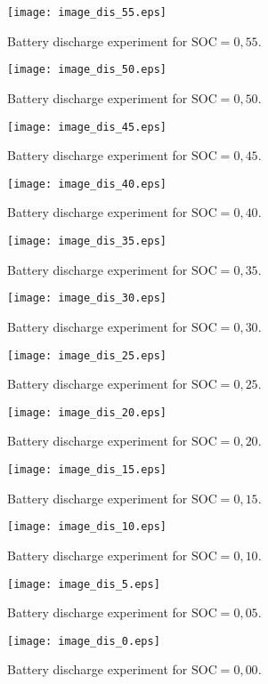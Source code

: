 \begin{figure}[h!]
	\centering
  	\texttt{[image: image\_dis\_55.eps]}
  	\caption{Battery discharge experiment for $\mathrm{SOC} = 0,55$.}
	\label{fig:image_dis_55}
\end{figure}
\begin{figure}[h!]
	\centering
  	\texttt{[image: image\_dis\_50.eps]}
  	\caption{Battery discharge experiment for $\mathrm{SOC} = 0,50$.}
	\label{fig:image_dis_50}
\end{figure}
\begin{figure}[h!]
	\centering
  	\texttt{[image: image\_dis\_45.eps]}
  	\caption{Battery discharge experiment for $\mathrm{SOC} = 0,45$.}
	\label{fig:image_dis_45}
\end{figure}
\begin{figure}[h!]
	\centering
  	\texttt{[image: image\_dis\_40.eps]}
  	\caption{Battery discharge experiment for $\mathrm{SOC} = 0,40$.}
	\label{fig:image_dis_40}
\end{figure}
\begin{figure}[h!]
	\centering
  	\texttt{[image: image\_dis\_35.eps]}
  	\caption{Battery discharge experiment for $\mathrm{SOC} = 0,35$.}
	\label{fig:image_dis_35}
\end{figure}
\begin{figure}[h!]
	\centering
  	\texttt{[image: image\_dis\_30.eps]}
  	\caption{Battery discharge experiment for $\mathrm{SOC} = 0,30$.}
	\label{fig:image_dis_30}
\end{figure}
\begin{figure}[h!]
	\centering
  	\texttt{[image: image\_dis\_25.eps]}
  	\caption{Battery discharge experiment for $\mathrm{SOC} = 0,25$.}
	\label{fig:image_dis_25}
\end{figure}
\begin{figure}[h!]
	\centering
  	\texttt{[image: image\_dis\_20.eps]}
  	\caption{Battery discharge experiment for $\mathrm{SOC} = 0,20$.}
	\label{fig:image_dis_20}
\end{figure}
\begin{figure}[h!]
	\centering
  	\texttt{[image: image\_dis\_15.eps]}
  	\caption{Battery discharge experiment for $\mathrm{SOC} = 0,15$.}
	\label{fig:image_dis_15}
\end{figure}
\begin{figure}[h!]
	\centering
  	\texttt{[image: image\_dis\_10.eps]}
  	\caption{Battery discharge experiment for $\mathrm{SOC} = 0,10$.}
	\label{fig:image_dis_10}
\end{figure}
\begin{figure}[h!]
	\centering
  	\texttt{[image: image\_dis\_5.eps]}
  	\caption{Battery discharge experiment for $\mathrm{SOC} = 0,05$.}
	\label{fig:image_dis_5}
\end{figure}
\begin{figure}[h!]
	\centering
  	\texttt{[image: image\_dis\_0.eps]}
  	\caption{Battery discharge experiment for $\mathrm{SOC} = 0,00$.}
	\label{fig:image_dis_0}
\end{figure}


